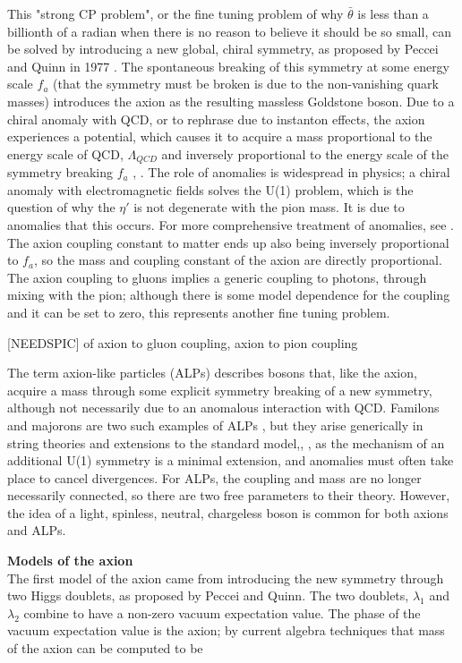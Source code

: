 \documentclass[12pt,twosides]{book}
\begin{document}
 This "strong CP problem", or the fine tuning problem of why $\bar \theta$ is less than a billionth of a radian when there is no reason to believe it should be so small, can be solved by introducing a new global, chiral symmetry, as proposed by Peccei and Quinn in 1977 \cite{peccei77}. The spontaneous breaking of this symmetry at some energy scale $f_a$ (that the symmetry must be broken is due to the non-vanishing quark masses) introduces the axion as the resulting massless Goldstone boson. Due to a chiral anomaly with QCD, or to rephrase due to instanton effects, the axion experiences a potential, which causes it to acquire a mass proportional to the energy scale of QCD, $\Lambda_{QCD}$ and inversely proportional to the energy scale of the symmetry breaking $f_a$ \cite{weinberg78}, \cite{wilczek78}. The role of anomalies is widespread in physics; a chiral anomaly with electromagnetic fields solves the U(1) problem, which is the question of why the $\eta'$ is not degenerate with the pion mass. It is due to anomalies that this occurs. For more comprehensive treatment of anomalies, see \cite{bardeen07}. The axion coupling constant to matter ends up also being inversely proportional to $f_a$, so the mass and coupling constant of the axion are directly proportional. The axion coupling to gluons implies a generic coupling to photons, through mixing with the pion; although there is some model dependence for the coupling and it can be set to zero, this represents another fine tuning problem.

[NEEDSPIC] of axion to gluon coupling, axion to pion coupling

The term axion-like particles (ALPs) describes bosons that, like the axion, acquire a mass through some explicit symmetry breaking of a new symmetry, although not necessarily due to an anomalous interaction with QCD. Familons and majorons are two such examples of ALPs \cite{kim87}, but they arise generically in string theories  and extensions to the standard model,\cite{masso06}, \cite{hewett12}, \cite{arias12} as the mechanism of an additional U(1) symmetry is a minimal extension, and anomalies must often take place to cancel divergences. For ALPs, the coupling and mass are no longer necessarily connected, so there are two free parameters to their theory. However, the idea of a light, spinless, neutral, chargeless boson is common for both axions and ALPs.

 \textbf{Models of the axion} \hfill \\

The first model of the axion came from introducing the new symmetry through two Higgs doublets, as proposed by Peccei and Quinn. The two doublets, $\lambda_1$ and $\lambda_2$ combine to have a non-zero vacuum expectation value. The phase of the vacuum expectation value is the axion; by current algebra techniques that mass of the axion can be computed to be 
\end{document}
